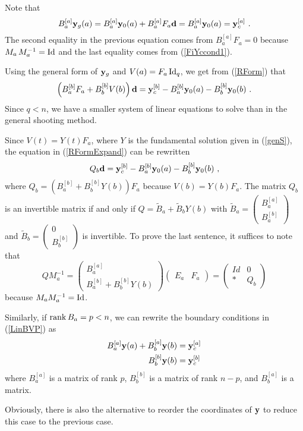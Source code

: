 Note that
\[
B_a^{[a]} \mathbf{y}_g(a) = B_a^{[a]} \mathbf{y}_0(a) + B_a^{[a]} F_a \mathbf{d}
 = B_a^{[a]} \mathbf{y}_0(a) = \mathbf{y}_{c}^{[a]} \ .
\]
The second equality in the previous equation comes from $B_a^{[a]} F_a=0$
because $M_a\,M_a^{-1} = \operatorname{Id}$ and the last equality comes from
(\ref{FiYccond1}).

Using the general form of $\mathbf{y}_g$ and $V(a) = F_a \operatorname{Id}_q$, we get
from (\ref{RForm}) that
\begin{equation} \label{RFormExpand}
\left( B_a^{[b]} F_a + B_b^{[b]} V(b) \right)\mathbf{d} = \mathbf{y}_c^{[b]}
- B_a^{[b]} \mathbf{y}_0(a) - B_b^{[b]} \mathbf{y}_0(b) \ .
\end{equation}
Since $q<n$, we have a smaller system of linear equations to solve
than in the general shooting method.


Since $V(t) = Y(t) F_a$, where $Y$ is the fundamental solution
given in (\ref{genS}), the equation in (\ref{RFormExpand}) can be rewritten
\[
Q_b \mathbf{d} = \mathbf{y}_c^{[b]} - B_a^{[b]}\mathbf{y}_0(a) - B_b^{[b]}\mathbf{y}_0(b) \ ,
\]
where $Q_b = \left( B_a^{[b]} + B_b^{[b]} Y(b) \right) F_a$
because $V(b) = Y(b) F_a$.  The matrix $Q_b$
is an invertible  matrix if and only if
$Q = \tilde{B}_a + \tilde{B}_b Y(b)$
with $\displaystyle \tilde{B}_a = \begin{pmatrix} B_a^{[a]} \\ B_a^{[b]}
\end{pmatrix}$
and $\displaystyle \tilde{B}_b = \begin{pmatrix} 0 \\ B_b^{[b]}
\end{pmatrix}$ is invertible.  To prove the last sentence, it suffices
to note that
\[
Q M_a^{-1} = \begin{pmatrix} B_a^{[a]} \\ B_a^{[b]} + B_b^{[b]}Y(b) \end{pmatrix}
\begin{pmatrix} E_a & F_a \end{pmatrix}
= \begin{pmatrix} Id & 0 \\ * & Q_b \end{pmatrix}
\]
because $M_a M_a^{-1} = \operatorname{Id}$.


\begin{rmk}
Similarly, if $\operatorname{rank} B_a = p < n$, we can rewrite the boundary
conditions in (\ref{LinBVP}) as
\begin{align*}
B_a^{[a]} \mathbf{y}(a) + B_b^{[a]} \mathbf{y}(b) &= \mathbf{y}_c^{[a]} \\
B_b^{[b]} \mathbf{y}(b) &= \mathbf{y}_c^{[b]}
\end{align*}
where $B_a^{[a]}$ is a  matrix of rank $p$, $B_b^{[b]}$ is a
 matrix of rank $n-p$, and $B_b^{[a]}$ is a 
matrix.

Obviously, there is also the alternative to reorder the coordinates
of $\mathbf{y}$ to reduce this case to the previous case.
\end{rmk}

